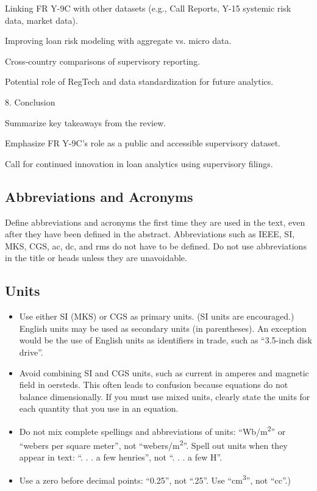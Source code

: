 \documentclass[conference]{IEEEtran}
\begin{document}
Linking FR Y-9C with other datasets (e.g., Call Reports, Y-15 systemic risk data, market data).

Improving loan risk modeling with aggregate vs. micro data.

Cross-country comparisons of supervisory reporting.

Potential role of RegTech and data standardization for future analytics.

8. Conclusion

Summarize key takeaways from the review.

Emphasize FR Y-9C’s role as a public and accessible supervisory dataset.

Call for continued innovation in loan analytics using supervisory filings.
\subsection{Abbreviations and Acronyms}\label{AA}
Define abbreviations and acronyms the first time they are used in the text, 
even after they have been defined in the abstract. Abbreviations such as 
IEEE, SI, MKS, CGS, ac, dc, and rms do not have to be defined. Do not use 
abbreviations in the title or heads unless they are unavoidable.

\subsection{Units}
\begin{itemize}
\item Use either SI (MKS) or CGS as primary units. (SI units are encouraged.) English units may be used as secondary units (in parentheses). An exception would be the use of English units as identifiers in trade, such as ``3.5-inch disk drive''.
\item Avoid combining SI and CGS units, such as current in amperes and magnetic field in oersteds. This often leads to confusion because equations do not balance dimensionally. If you must use mixed units, clearly state the units for each quantity that you use in an equation.
\item Do not mix complete spellings and abbreviations of units: ``Wb/m\textsuperscript{2}'' or ``webers per square meter'', not ``webers/m\textsuperscript{2}''. Spell out units when they appear in text: ``. . . a few henries'', not ``. . . a few H''.
\item Use a zero before decimal points: ``0.25'', not ``.25''. Use ``cm\textsuperscript{3}'', not ``cc''.)
\end{itemize}
\end{document}
